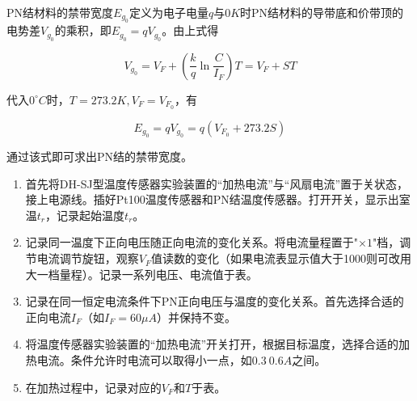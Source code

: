 \documentclass[UTF-8, a4paper, 12pt]{ctexart}
\begin{document}
    PN结材料的禁带宽度$E_{g_0}$定义为电子电量$q$与$0K$时PN结材料的导带底和价带顶的电势差$V_{g_0}$的乘积，即$E_{g_0} = q V_{g_0}$。由上式得

    $$V_{g_0} = V_F + (\frac k q \ln \frac{C}{I_F})T = V_F + S T$$

    代入$0^\circ C$时，$T = 273.2K, V_F = V_{F_0}$，有

    $$E_{g_0} = qV_{g_0} = q(V_{F_0} + 273.2S)$$

    通过该式即可求出PN结的禁带宽度。

    \textbf{ }

    \songti

    \begin{enumerate}[（1）]
        \item 首先将DH-SJ型温度传感器实验装置的“加热电流”与“风扇电流”置于关状态，接上电源线。插好Pt100温度传感器和PN结温度传感器。打开开关，显示出室温$t_r$，记录起始温度$t_r$。
        \item 记录同一温度下正向电压随正向电流的变化关系。将电流量程置于"$\times 1$"档，调节电流调节旋钮，观察$V_F$值读数的变化（如果电流表显示值大于1000则可改用大一档量程）。记录一系列电压、电流值于表。
        \item 记录在同一恒定电流条件下PN正向电压与温度的变化关系。首先选择合适的正向电流$I_F$（如$I_F = 60\mu A$）并保持不变。
        \item 将温度传感器实验装置的“加热电流”开关打开，根据目标温度，选择合适的加热电流。条件允许时电流可以取得小一点，如$0.3~0.6A$之间。
        \item 在加热过程中，记录对应的$V_F$和$T$于表。
    \end{enumerate}
\end{document}

